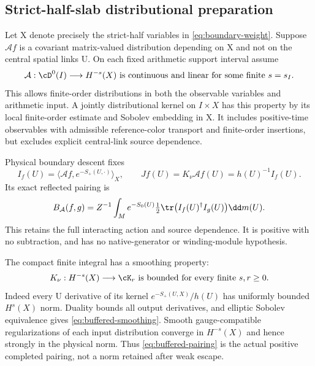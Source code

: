 \subsection{Strict-half-slab distributional preparation}
Let X denote precisely the strict-half variables in
\eqref{eq:boundary-weight}. Suppose $\mathcal Af$ is a covariant
matrix-valued distribution depending on X and not on the central
spatial links U. On each fixed arithmetic support interval assume
\begin{equation}\label{eq:buffered-input}
\mathcal A:\cD^0(I)\longrightarrow H^{-s}(X)
\text{ is continuous and linear for some finite }s=s_I.
\end{equation}
This allows finite-order distributions in both the observable
variables and arithmetic input. A jointly distributional kernel
on $I\times X$ has this property by its local finite-order estimate
and Sobolev embedding in X. It includes positive-time observables
with admissible reference-color transport and finite-order
insertions, but excludes explicit central-link source dependence.

Physical boundary descent fixes
\begin{equation}\label{eq:buffered-source}
I_f(U)=\langle\mathcal Af,e^{-S_+(U,\cdot)}\rangle_X,
\qquad Jf(U)=K_\nu\mathcal Af(U)=h(U)^{-1}I_f(U).
\end{equation}
Its exact reflected pairing is
\begin{equation}\label{eq:buffered-pairing}
B_{\mathcal A}(f,g)=Z^{-1}\int_M e^{-S_0(U)}
\tfrac12\tr\big(I_f(U)^\dagger I_g(U)\big)\dd m(U).
\end{equation}
This retains the full interacting action and source dependence.
It is positive with no subtraction, and has no native-generator
or winding-module hypothesis.

The compact finite integral has a smoothing property:
\begin{equation}\label{eq:buffered-smoothing}
K_\nu:H^{-s}(X)\longrightarrow\cK_r
\text{ is bounded for every finite }s,r\ge0.
\end{equation}
Indeed every U derivative of its kernel $e^{-S_+(U,X)}/h(U)$
has uniformly bounded $H^s(X)$ norm. Duality bounds all output
derivatives, and elliptic Sobolev equivalence gives
\eqref{eq:buffered-smoothing}. Smooth gauge-compatible regularizations
of each input distribution converge in $H^{-s}(X)$ and hence strongly
in the physical norm. Thus \eqref{eq:buffered-pairing} is the actual
positive completed pairing, not a norm retained after weak escape.

